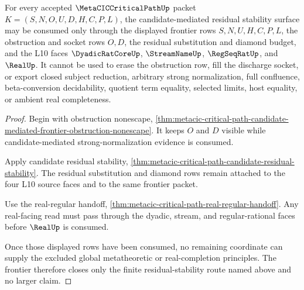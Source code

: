 \begin{theorem}
\label{thm:metacic-critical-path-frontier-nonescape}
For every accepted $\MetaCICCriticalPathUp$ packet $K=(S,N,O,U,D,H,C,P,L)$, the candidate-mediated residual stability surface may be consumed only through the displayed frontier rows $S,N,U,H,C,P,L$, the obstruction and socket rows $O,D$, the residual substitution and diamond budget, and the L10 faces $\DyadicRatCoreUp$, $\StreamNameUp$, $\RegSeqRatUp$, and $\RealUp$. It cannot be used to erase the obstruction row, fill the discharge socket, or export closed subject reduction, arbitrary strong normalization, full confluence, beta-conversion decidability, quotient term equality, selected limits, host equality, or ambient real completeness.
\end{theorem}
\begin{proof}
Begin with obstruction nonescape, \autoref{thm:metacic-critical-path-candidate-mediated-frontier-obstruction-nonescape}. It keeps $O$ and $D$ visible while candidate-mediated strong-normalization evidence is consumed.

Apply candidate residual stability, \autoref{thm:metacic-critical-path-candidate-residual-stability}. The residual substitution and diamond rows remain attached to the four L10 source faces and to the same frontier packet.

Use the real-regular handoff, \autoref{thm:metacic-critical-path-real-regular-handoff}. Any real-facing read must pass through the dyadic, stream, and regular-rational faces before $\RealUp$ is consumed.

Once those displayed rows have been consumed, no remaining coordinate can supply the excluded global metatheoretic or real-completion principles. The frontier therefore closes only the finite residual-stability route named above and no larger claim.
\end{proof}

